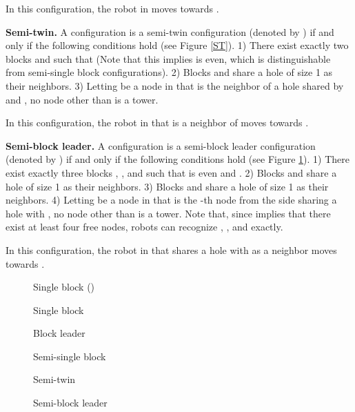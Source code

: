 \documentclass[11pt]{article}
\begin{document}
\begin{itemize*}
In this configuration, the robot in  moves towards .

\item {\bf Semi-twin.} A configuration  is a semi-twin configuration (denoted by ) if and only if the following conditions hold (see Figure \ref{ST}). 1) There exist exactly two blocks  and  such that  (Note that this implies  is even, which is distinguishable from semi-single block configurations). 2) Blocks  and  share a hole of size 1 as their neighbors. 3) Letting  be a node in  that is the neighbor of a hole shared by  and , no node other than  is a tower.

In this configuration, the robot in  that is a neighbor of  moves towards .

\item {\bf Semi-block leader.} A configuration  is a semi-block leader configuration (denoted by ) if and only if the following conditions hold (see Figure \ref{SBL}). 1) There exist exactly three blocks , , and  such that  is even and . 2) Blocks  and  share a hole of size 1 as their neighbors. 3) Blocks  and  share a hole of size 1 as their neighbors. 4) Letting  be a node in  that is the -th node from the side sharing a hole with , no node other than  is a tower. Note that, since  implies that there exist at least four free nodes, robots can recognize , , and  exactly.

In this configuration, the robot in  that shares a hole with  as a neighbor moves towards .
\end{itemize*}

\begin{figure}[t!]
 \begin{minipage}[b]{.3\linewidth}
  \centering{}
  \caption{Single block  ()\label{SB}}
 \end{minipage} \hfill
 \begin{minipage}[b]{.3\linewidth}
  \centering{}
  \caption{Single block \label{SB2}}
 \end{minipage} \hfill
 \begin{minipage}[b]{.3\linewidth}
  \centering{}
  \caption{Block leader \label{BL}}
 \end{minipage} \hfill
 \begin{minipage}[b]{.3\linewidth}
  \centering{}
  \caption{Semi-single block \label{SSB}}
 \end{minipage} \hfill
 \begin{minipage}[b]{.3\linewidth}
  \centering{}
  \caption{Semi-twin \label{ST}}
 \end{minipage} \hfill
 \begin{minipage}[b]{.3\linewidth}
  \centering{}
  \caption{Semi-block leader \label{SBL}}
 \end{minipage} \hfill
\end{figure}  
\end{document}

